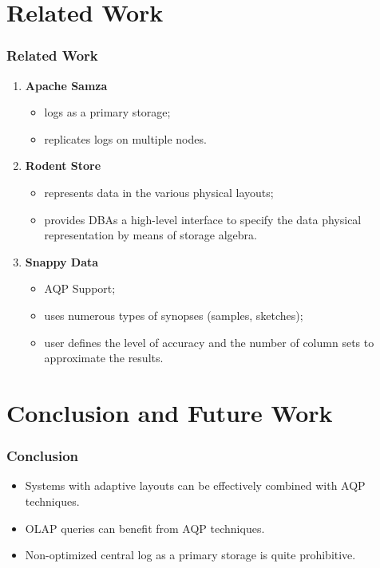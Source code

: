 \documentclass{beamer}
\begin{document}
\section{Related Work}
\begin{frame}
\frametitle{Related Work} \pause
\begin{enumerate}
\item{\textbf{Apache Samza}}
\begin{itemize}
\item{logs as a primary storage;}
\item{replicates logs on multiple nodes.}
\end{itemize}
\pause
\item{\textbf{Rodent Store}}
\begin{itemize}
\item{represents data in the various physical layouts;}
\item{provides DBAs a high-level interface to specify the data physical representation by means of storage algebra.}
\end{itemize}
\pause
\item{\textbf{Snappy Data}}
\begin{itemize}
\item{AQP Support;}
\item{uses numerous types of synopses (samples, sketches);}
\item{user defines the level of accuracy and the number of column sets to approximate the results.}
\end{itemize}
\end{enumerate}
\end{frame}

\section{Conclusion and Future Work}
\begin{frame}
\frametitle{Conclusion} \pause
\begin{itemize}
\item{Systems with adaptive layouts can be effectively combined with AQP techniques.} \pause
\item{OLAP queries can benefit from AQP techniques.} \pause
\item{Non-optimized central log as a primary storage is quite prohibitive.}
\end{itemize}
\end{frame}
\end{document}
